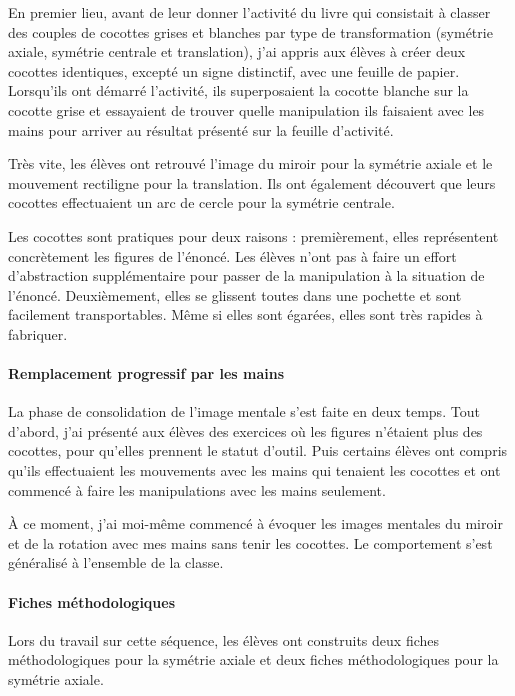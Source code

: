 En premier lieu, avant de leur donner l'activité du livre qui consistait à classer des couples de cocottes grises et blanches par type de transformation (symétrie axiale, symétrie centrale et translation), j'ai appris aux élèves à créer deux cocottes identiques, excepté un signe distinctif, avec une feuille de papier. Lorsqu'ils ont démarré l'activité, ils superposaient la cocotte blanche sur la cocotte grise et essayaient de trouver quelle manipulation ils faisaient avec les mains pour arriver au résultat présenté sur la feuille d'activité.

Très vite, les élèves ont retrouvé l'image du miroir pour la symétrie axiale et le mouvement rectiligne pour la translation. Ils ont également découvert que leurs cocottes effectuaient un arc de cercle pour la symétrie centrale.

Les cocottes sont pratiques pour deux raisons : premièrement, elles représentent concrètement les figures de l'énoncé. Les élèves n'ont pas à faire un effort d'abstraction supplémentaire pour passer de la manipulation à la situation de l'énoncé. Deuxièmement, elles se glissent toutes dans une pochette et sont facilement transportables. Même si elles sont égarées, elles sont très rapides à fabriquer.

\paragraph{Remplacement progressif par les mains}

La phase de consolidation de l'image mentale s'est faite en deux temps. Tout d'abord, j'ai présenté aux élèves des exercices où les figures n'étaient plus des cocottes, pour qu'elles prennent le statut d'outil. Puis certains élèves ont compris qu'ils effectuaient les mouvements avec les mains qui tenaient les cocottes et ont commencé à faire les manipulations avec les mains seulement.

À ce moment, j'ai moi-même commencé à évoquer les images mentales du miroir et de la rotation avec mes mains sans tenir les cocottes. Le comportement s'est généralisé à l'ensemble de la classe.

\paragraph{Fiches méthodologiques}

Lors du travail sur cette séquence, les élèves ont construits deux fiches méthodologiques pour la symétrie axiale et deux fiches méthodologiques pour la symétrie axiale. 

